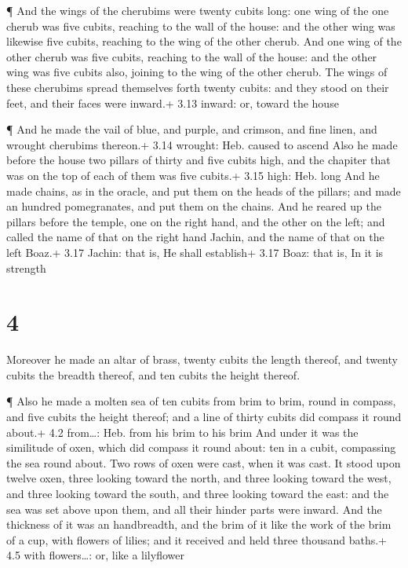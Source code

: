  ¶ And the wings of the cherubims were twenty cubits long:
one wing of the one cherub was five cubits, reaching to the wall of the
house: and the other wing was likewise five cubits, reaching to the wing
of the other cherub.  And one wing of the other cherub was
five cubits, reaching to the wall of the house: and the other wing was
five cubits also, joining to the wing of the other cherub. 
The wings of these cherubims spread themselves forth twenty cubits: and
they stood on their feet, and their faces were inward.+ 3.13 inward: or,
toward the house

 ¶ And he made the vail of blue, and purple, and crimson,
and fine linen, and wrought cherubims thereon.+ 3.14 wrought: Heb.
caused to ascend  Also he made before the house two pillars
of thirty and five cubits high, and the chapiter that was on the top of
each of them was five cubits.+ 3.15 high: Heb. long  And he
made chains, as in the oracle, and put them on the heads of the pillars;
and made an hundred pomegranates, and put them on the chains.
 And he reared up the pillars before the temple, one on the
right hand, and the other on the left; and called the name of that on
the right hand Jachin, and the name of that on the left Boaz.+ 3.17
Jachin: that is, He shall establish+ 3.17 Boaz: that is, In it is
strength

\hypertarget{section-3}{%
\section{4}\label{section-3}}

 Moreover he made an altar of brass, twenty cubits the
length thereof, and twenty cubits the breadth thereof, and ten cubits
the height thereof.

 ¶ Also he made a molten sea of ten cubits from brim to
brim, round in compass, and five cubits the height thereof; and a line
of thirty cubits did compass it round about.+ 4.2 from\ldots: Heb. from
his brim to his brim  And under it was the similitude of
oxen, which did compass it round about: ten in a cubit, compassing the
sea round about. Two rows of oxen were cast, when it was cast.
 It stood upon twelve oxen, three looking toward the north,
and three looking toward the west, and three looking toward the south,
and three looking toward the east: and the sea was set above upon them,
and all their hinder parts were inward.  And the thickness
of it was an handbreadth, and the brim of it like the work of the brim
of a cup, with flowers of lilies; and it received and held three
thousand baths.+ 4.5 with flowers\ldots: or, like a lilyflower

